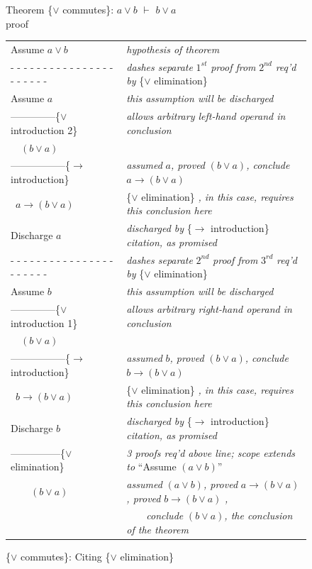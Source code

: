 {\begin{figure}
Theorem \{$\vee$ commutes\}: $a \vee b$ $\vdash$ $b \vee a$ \\
proof
\begin{center}
\begin{tabular}{ll}
Assume $a \vee b$          &\emph{hypothesis of theorem}\\
 - - - - - - - - - - - - - - - - - - - - - -&\emph{dashes separate} $1^{st}$ \emph{proof from} $2^{nd}$ \emph{req'd by} \{$\vee$ elimination\} \\
Assume $a$          &\emph{this assumption will be discharged}\\
--------------\{$\vee$ introduction 2\} &\emph{allows arbitrary left-hand operand in conclusion}\\
~~$(b \vee a)$        &\\
-----------------\{$\rightarrow$ introduction\} &\emph{assumed} $a$\emph{, proved} $(b \vee a)$\emph{, conclude} $a \rightarrow (b \vee a)$ \\
~$a \rightarrow (b \vee a)$ &\{$\vee$ elimination\} \emph{, in this case, requires this conclusion here}\\
Discharge $a$              &\emph{discharged by} \{$\rightarrow$ introduction\} \emph{citation, as promised}\\
 - - - - - - - - - - - - - - - - - - - - - -&\emph{dashes separate} $2^{nd}$ \emph{proof from} $3^{rd}$ \emph{req'd by} \{$\vee$ elimination\}\\
Assume $b$          &\emph{this assumption will be discharged}\\
--------------\{$\vee$ introduction 1\} &\emph{allows arbitrary right-hand operand in conclusion}\\
~~$(b \vee a)$        &\\
-----------------\{$\rightarrow$ introduction\} &\emph{assumed} $b$\emph{, proved} $(b \vee a)$\emph{, conclude} $b \rightarrow (b \vee a)$\\
~$b \rightarrow (b \vee a)$ &\{$\vee$ elimination\} \emph{, in this case, requires this conclusion here}\\
Discharge $b$              &\emph{discharged by} \{$\rightarrow$ introduction\} \emph{citation, as promised}\\
---------------\{$\vee$ elimination\}       &\emph{3 proofs req'd above line; scope extends to} ``Assume $(a \vee b)$''\\
~~~~$(b \vee a)$        &\emph{assumed} $(a \vee b)$\emph{, proved} $a \rightarrow (b \vee a)$\emph{, proved} $b \rightarrow (b \vee a)$ \emph{,}\\
       &~~~~\emph{conclude} $(b \vee a)$\emph{, the conclusion of the theorem}\\
\end{tabular}
\end{center}
\caption{\{$\vee$ commutes\}: Citing \{$\vee$ elimination\}}
\label{fig:or-commutes-proof}
\end{figure}

}
